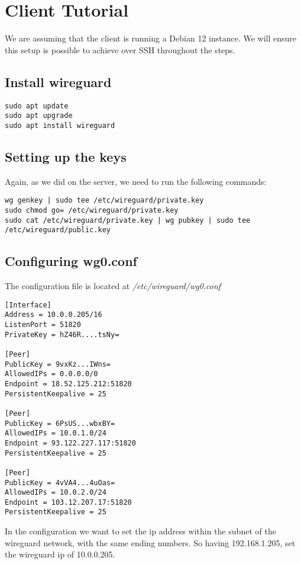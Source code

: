 \documentclass[letterpaper, 11pt]{article}
\begin{document}
\newpage

\section{Client Tutorial}
\label{sec:org1a1510a}
We are assuming that the client is running a Debian 12 instance. We will ensure this setup is possible to achieve over SSH throughout the steps.

\subsection{Install wireguard}
\label{sec:orge8f53b6}
\begin{verbatim}
sudo apt update
sudo apt upgrade
sudo apt install wireguard
\end{verbatim}

\subsection{Setting up the keys}
\label{sec:org841d747}
Again, as we did on the server, we need to run the following commands:
\begin{verbatim}
wg genkey | sudo tee /etc/wireguard/private.key
sudo chmod go= /etc/wireguard/private.key
sudo cat /etc/wireguard/private.key | wg pubkey | sudo tee /etc/wireguard/public.key
\end{verbatim}

\subsection{Configuring wg0.conf}
\label{sec:org483633c}

The configuration file is located at \textit{/etc/wireguard/wg0.conf}
\begin{verbatim}
[Interface]
Address = 10.0.0.205/16
ListenPort = 51820
PrivateKey = hZ46R....tsNy=

[Peer]
PublicKey = 9vxKz...IWns=
AllowedIPs = 0.0.0.0/0
Endpoint = 18.52.125.212:51820
PersistentKeepalive = 25

[Peer]
PublicKey = 6PsUS...wbxBY=
AllowedIPs = 10.0.1.0/24
Endpoint = 93.122.227.117:51820
PersistentKeepalive = 25

[Peer]
PublicKey = 4vVA4...4uOas=
AllowedIPs = 10.0.2.0/24
Endpoint = 103.12.207.17:51820
PersistentKeepalive = 25
\end{verbatim}

In the configuration we want to set the ip address within the subnet of the wireguard network, with the same ending numbers. So having 192.168.1.205, set the wireguard ip of 10.0.0.205.
\end{document}
